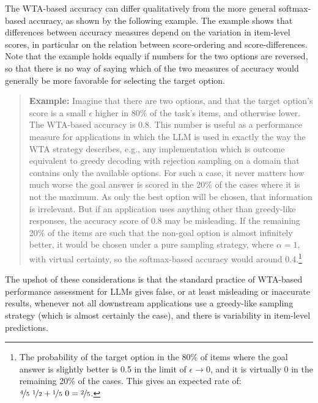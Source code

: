 \documentclass[fleqn]{article}
\begin{document}
The WTA-based accuracy can differ qualitatively from the more general softmax-based accuracy, as shown by the following example.
The example shows that differences between accuracy measures depend on the variation in item-level scores, in particular on the relation between score-ordering and score-differences.
Note that the example holds equally if numbers for the two options are reversed, so that there is no way of saying which of the two measures of accuracy would generally be more favorable for selecting the target option.
%
\begin{quote}
  \textbf{Example:}
  Imagine that there are two options, and that the target option's score is a small $\epsilon$ higher in 80\% of the task's items, and otherwise lower.
  The WTA-based accuracy is 0.8.
  This number is useful as a performance measure for applications in which the LLM is used in exactly the way the WTA strategy describes, e.g., any implementation which is outcome equivalent to greedy decoding with rejection sampling on a domain that contains only the available options.
  For such a case, it never matters how much worse the goal answer is scored in the 20\% of the cases where it is not the maximum.
  As only the best option will be chosen, that information is irrelevant.
  But if an application uses anything other than greedy-like responses, the accuracy score of 0.8 may be misleading.
  If the remaining 20\% of the items are such that the non-goal option is almost infinitely better, it would be chosen under a pure sampling strategy, where $\alpha = 1$, with virtual certainty, so the softmax-based accuracy would around 0.4.\footnote{The probability of the target option in the 80\% of items where the goal answer is slightly better is 0.5 in the limit of $\epsilon \rightarrow 0$, and it is virtually 0 in the remaining 20\% of the cases. This gives an expected rate of: $\nicefrac{4}{5} \ \nicefrac{1}{2} + \nicefrac{1}{5} \ 0 = \nicefrac{2}{5}$.}
\end{quote}
%
The upshot of these considerations is that the standard practice of WTA-based performance assessment for LLMs gives false, or at least misleading or inaccurate results, whenever not all downstream applications use a greedy-like sampling strategy (which is almost certainly the case), and there is variability in item-level predictions.



\end{document}
